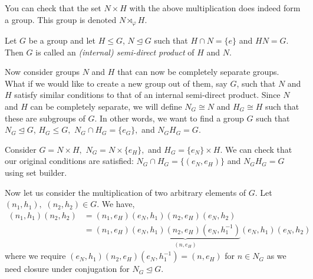 You can check that the set $N\times H$ with the above multiplication does indeed form a group. This group is denoted $N\rtimes_\varphi H.$

\begin{definition}
  Let $G$ be a group and let $H\leq G$, $N\trianglelefteq G$ such that $H\cap N = \{e\}$
  and $HN=G$. Then $G$ is called an \emph{(internal) semi-direct product} of $H$ and $N$.
  \label{def:intSemidirProd}
\end{definition}

Now consider groups $N$ and $H$ that can now be completely separate groups. What if we would like to create a new group out of them, say $G$, such that $N$ and $H$ satisfy similar conditions to that of an internal semi-direct product. Since $N$ and $H$ can be completely separate, we will define $N_G\cong N$ and $H_G\cong H$ such that these are subgroups of $G$. In other words, we want to find a  group $G$ such that $N_G \trianglelefteq G$, $H_G \leq G,$ $N_G \cap H_G=\{e_G\},$ and $N_GH_G=G.$

Consider $G=N\times H,$ $N_G=N\times \{e_H\},$ and $H_G=\{e_N\} \times H.$ We can check that our original conditions are satisfied: $N_G \cap H_G =\{(e_N,e_H)\}$ and $N_GH_G=G$ using set builder. 

Now let us consider the multiplication of two arbitrary elements of $G.$ Let $(n_1,h_1),$ $(n_2,h_2)\in G.$ We have,
\begin{align*}
    (n_1,h_1)(n_2,h_2)&=(n_1,e_H)(e_N,h_1)(n_2,e_H)(e_N,h_2)
    \\& =(n_1,e_H)\underbrace{(e_N,h_1)(n_2,e_H)(e_N,h_1^{-1})}_{(n,e_H)}(e_N,h_1)(e_N,h_2)
\end{align*}
where we require $(e_N,h_1)(n_2,e_H)(e_N,h_1^{-1})=(n,e_H)$ for $n\in N_G$ as we need closure under conjugation for $N_G \trianglelefteq G$.

